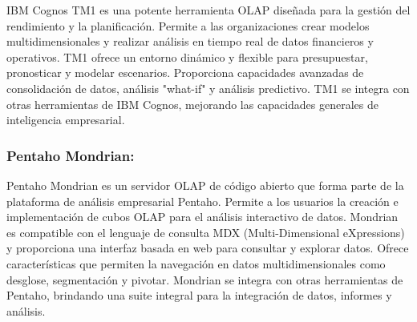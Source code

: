 IBM Cognos TM1 es una potente herramienta OLAP diseñada para la gestión del rendimiento y la planificación. Permite a las 
organizaciones crear modelos multidimensionales y realizar análisis en tiempo real de datos financieros y operativos. TM1 
ofrece un entorno dinámico y flexible para presupuestar, pronosticar y modelar escenarios. Proporciona capacidades 
avanzadas de consolidación de datos, análisis "what-if" y análisis predictivo. TM1 se integra con otras herramientas de 
IBM Cognos, mejorando las capacidades generales de inteligencia empresarial.

\subsubsection{Pentaho Mondrian: }

Pentaho Mondrian es un servidor OLAP de código abierto que forma parte de la plataforma de análisis empresarial Pentaho. 
Permite a los usuarios la creación e implementaci\'on de cubos OLAP para el análisis interactivo de datos. Mondrian es 
compatible con el lenguaje de consulta MDX (Multi-Dimensional eXpressions) y proporciona una interfaz basada en web 
para consultar y explorar datos. Ofrece características que permiten la navegaci\'on en datos multidimensionales como 
desglose, segmentación y pivotar. Mondrian se integra con otras herramientas de Pentaho, brindando una 
suite integral para la integración de datos, informes y análisis.
